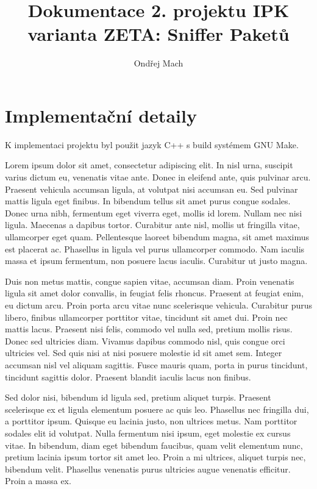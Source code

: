 \documentclass[]{article}
\title{Dokumentace 2. projektu IPK \\ varianta ZETA: Sniffer Paketů}
\author{Ondřej Mach}
\begin{document}
\maketitle

\section{Implementační detaily}
K implementaci projektu byl použit jazyk C++ s build systémem GNU Make.





Lorem ipsum dolor sit amet, consectetur adipiscing elit. In nisl urna, suscipit varius dictum eu, venenatis vitae ante. Donec in eleifend ante, quis pulvinar arcu. Praesent vehicula accumsan ligula, at volutpat nisi accumsan eu. Sed pulvinar mattis ligula eget finibus. In bibendum tellus sit amet purus congue sodales. Donec urna nibh, fermentum eget viverra eget, mollis id lorem. Nullam nec nisi ligula. Maecenas a dapibus tortor. Curabitur ante nisl, mollis ut fringilla vitae, ullamcorper eget quam. Pellentesque laoreet bibendum magna, sit amet maximus est placerat ac. Phasellus in ligula vel purus ullamcorper commodo. Nam iaculis massa et ipsum fermentum, non posuere lacus iaculis. Curabitur ut justo magna.

Duis non metus mattis, congue sapien vitae, accumsan diam. Proin venenatis ligula sit amet dolor convallis, in feugiat felis rhoncus. Praesent at feugiat enim, eu dictum arcu. Proin porta arcu vitae nunc scelerisque vehicula. Curabitur purus libero, finibus ullamcorper porttitor vitae, tincidunt sit amet dui. Proin nec mattis lacus. Praesent nisi felis, commodo vel nulla sed, pretium mollis risus. Donec sed ultricies diam. Vivamus dapibus commodo nisl, quis congue orci ultricies vel. Sed quis nisi at nisi posuere molestie id sit amet sem. Integer accumsan nisl vel aliquam sagittis. Fusce mauris quam, porta in purus tincidunt, tincidunt sagittis dolor. Praesent blandit iaculis lacus non finibus.

Sed dolor nisi, bibendum id ligula sed, pretium aliquet turpis. Praesent scelerisque ex et ligula elementum posuere ac quis leo. Phasellus nec fringilla dui, a porttitor ipsum. Quisque eu lacinia justo, non ultrices metus. Nam porttitor sodales elit id volutpat. Nulla fermentum nisi ipsum, eget molestie ex cursus vitae. In bibendum, diam eget bibendum faucibus, quam velit elementum nunc, pretium lacinia ipsum tortor sit amet leo. Proin a mi ultrices, aliquet turpis nec, bibendum velit. Phasellus venenatis purus ultricies augue venenatis efficitur. Proin a massa ex.
\end{document}
